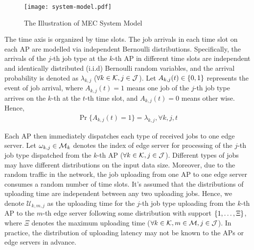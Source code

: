 \begin{figure}[ht]
    \centering
    \texttt{[image: system-model.pdf]}
    \caption{The Illustration of MEC System Model}
    \label{fig:system}
\end{figure}

The time axis is organized by time slots.
The job arrivals in each time slot on each AP are modelled via independent Bernoulli distributions.
Specifically, the arrivals of the $j$-th job type at the $k$-th AP in different time slots are independent and identically distributed (i.i.d) Bernoulli random variables, and the arrival probability is denoted as $\lambda_{k,j}$ ($\forall k\in\mathcal{K}, j\in\mathcal{J}$).
Let $A_{k,j}(t) \in \{0,1\}$ represents the event of job arrival, where $A_{k,j}(t)=1$ means one job of the $j$-th job type arrives on the $k$-th at the $t$-th time slot, and $A_{k,j}(t)=0$ means other wise.
Hence,
\begin{align}
    \Pr\{ A_{k,j}(t) = 1 \} = \lambda_{k,j}, \forall k,j,t
\end{align}

Each AP then immediately dispatches each type of received jobs to one edge server.
Let $\omega_{k,j} \in \mathcal{M}_{k}$ denotes the index of edge server for processing of the $j$-th job type dispatched from the $k$-th AP ($\forall k\in\mathcal{K}, j\in\mathcal{J}$).
Different types of jobs may have different distributions on the input data size.
Moreover, due to the random traffic in the network, the job uploading from one AP to one edge server consumes a random number of time slots.
It's assumed that the distributions of uploading time are independent between any two uploading jobs.
Hence, we denote $\mathcal{U}_{k,m,j}$ as the uploading time for the $j$-th job type uploading from the $k$-th AP to the $m$-th edge server following some distribution with support $\{1, \dots, \Xi\}$, where $\Xi$ denotes the maximum uploading time ($\forall k\in\mathcal{K}, m\in\mathcal{M}, j\in\mathcal{J}$).
In practice, the distribution of uploading latency may not be known to the APs or edge servers in advance.

